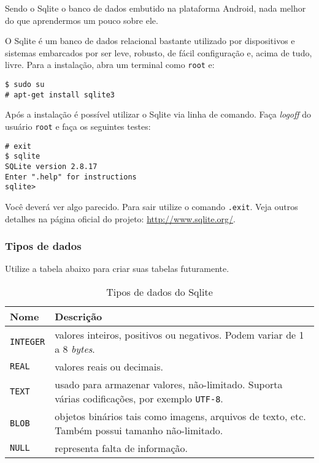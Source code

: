 Sendo o Sqlite o banco de dados embutido na plataforma Android, nada melhor do que aprendermos um pouco
sobre ele.

O Sqlite é um banco de dados relacional bastante utilizado por dispositivos e sistemas embarcados por
ser leve, robusto, de fácil configuração e, acima de tudo, livre. Para a instalação, abra um terminal
como \texttt{root} e:

\begin{flushleft}
\texttt{\$ sudo su \\
\# apt-get install sqlite3 \\}
\end{flushleft}

Após a instalação é possível utilizar o Sqlite via linha de comando. Faça \textit{logoff} do usuário
\texttt{root} e faça os seguintes testes:

\begin{flushleft}
\texttt{\# exit \\
\$ sqlite \\
SQLite version 2.8.17\\
Enter ".help" for instructions\\
sqlite>\\}
\end{flushleft}

Você deverá ver algo parecido. Para sair utilize o comando \texttt{.exit}. Veja outros detalhes na página
oficial do projeto: \url{http://www.sqlite.org/}.

\subsubsection{Tipos de dados}

Utilize a tabela abaixo para criar suas tabelas futuramente.

\begin{table}[H]
\begin{tabularx}{400pt}{lX}
\hline
\textbf{Nome} & \textbf{Descrição} \\
\hline
\texttt{INTEGER} & valores inteiros, positivos ou negativos. Podem variar de 1 a 8 \textit{bytes}.\\
\texttt{REAL} & valores reais ou decimais.\\
\texttt{TEXT} & usado para armazenar valores, não-limitado. Suporta várias codificações, por exemplo \texttt{UTF-8}.\\
\texttt{BLOB} & objetos binários tais como imagens, arquivos de texto, etc. Também possui tamanho não-limitado.\\
\texttt{NULL} & representa falta de informação.\\
\hline
\end{tabularx}
\caption{Tipos de dados do Sqlite}
\end{table}

